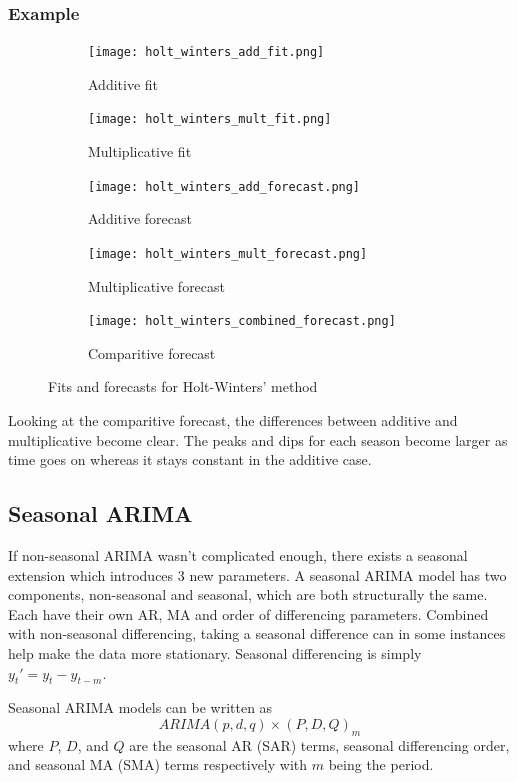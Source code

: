 \documentclass{article}
\begin{document}
  \subsubsection{Example}
  \begin{figure}[H]
    \centering
    \begin{subfigure}[b]{0.45\linewidth}
      \texttt{[image: holt\_winters\_add\_fit.png]}
       \caption{Additive fit}
    \end{subfigure}
    \begin{subfigure}[b]{0.45\linewidth}
      \texttt{[image: holt\_winters\_mult\_fit.png]}
      \caption{Multiplicative fit}
    \end{subfigure}
    \begin{subfigure}[b]{0.45\linewidth}
      \texttt{[image: holt\_winters\_add\_forecast.png]}
       \caption{Additive forecast}
    \end{subfigure}
    \begin{subfigure}[b]{0.45\linewidth}
      \texttt{[image: holt\_winters\_mult\_forecast.png]}
      \caption{Multiplicative forecast}
    \end{subfigure}
    \begin{subfigure}[b]{0.75\linewidth}
      \texttt{[image: holt\_winters\_combined\_forecast.png]}
      \caption{Comparitive forecast}
    \end{subfigure}
    \caption{Fits and forecasts for Holt-Winters' method}
  \end{figure}

  Looking at the comparitive forecast, the differences between additive and multiplicative become clear. The peaks and dips for each season become larger as time goes on whereas it stays constant in the additive case.

  \newpage
  \subsection{Seasonal ARIMA}
  If non-seasonal ARIMA wasn't complicated enough, there exists a seasonal extension which introduces 3 new parameters. A seasonal ARIMA model has two components, non-seasonal and seasonal, which are both structurally the same. Each have their own AR, MA and order of differencing parameters. Combined with non-seasonal differencing, taking a seasonal difference can in some instances help make the data more stationary. Seasonal differencing is simply $y_t' = y_t - y_{t-m}$. 
  
  Seasonal ARIMA models can be written as 
  \begin{equation*}
    ARIMA(p,d,q)\times(P,D,Q)_m
  \end{equation*}
  where $P$, $D$, and $Q$ are the seasonal AR (SAR) terms, seasonal differencing order, and seasonal MA (SMA) terms respectively with $m$ being the period.
\end{document}
